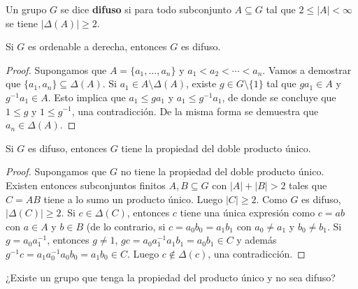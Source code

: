 \begin{definition}
	Un grupo $G$ se dice \textbf{difuso} si para todo subconjunto $A\subseteq
	G$ tal que $2\leq |A|<\infty$ se tiene $|\Delta(A)|\geq2$.
\end{definition}

\begin{lemma}
	Si $G$ es ordenable a derecha, entonces $G$ es difuso.	
\end{lemma}

\begin{proof}
	Supongamos que $A=\{a_1,\dots,a_n\}$ y $a_1<a_2<\cdots<a_n$. Vamos a
	demostrar que $\{a_1,a_n\}\subseteq\Delta(A)$. Si $a_1\in
	A\setminus\Delta(A)$, existe $g\in G\setminus\{1\}$ tal que $ga_1\in A$ y
	$g^{-1}a_1\in A$. Esto implica que $a_1\leq ga_1$ y $a_1\leq g^{-1}a_1$, de
	donde se concluye que $1\leq g$ y $1\leq g^{-1}$, una contradicción. De la
	misma forma se demuestra que $a_n\in \Delta(A)$.
\end{proof}

\begin{lemma}
	\label{lemma:difuso=>2up}
	Si $G$ es difuso, entonces $G$ tiene la propiedad del doble producto único.	
\end{lemma}

\begin{proof}
	Supongamos que $G$ no tiene la propiedad del doble producto único. Existen
	entonces subconjuntos finitos $A,B\subseteq G$ con $|A|+|B|>2$ tales que
	$C=AB$ tiene a lo sumo un producto único. Luego $|C|\geq2$. Como $G$ es
	difuso, $|\Delta(C)|\geq2$. Si $c\in\Delta(C)$, entonces $c$ tiene una
	única expresión como $c=ab$ con $a\in A$ y $b\in B$ (de lo contrario, si
	$c=a_0b_0=a_1b_1$ con $a_0\ne a_1$ y $b_0\ne b_1$. Si $g=a_0a_1^{-1}$,
	entonces $g\ne 1$, $gc=a_0a_1^{-1}a_1b_1=a_0b_1\in C$ y además
	$g^{-1}c=a_1a_0^{-1}a_0b_0=a_1b_0\in C$. Luego $c\not\in\Delta(c)$, una
	contradicción.
\end{proof}

\begin{problem}
	¿Existe un grupo que tenga la propiedad del producto único y no sea difuso? 	
\end{problem}

